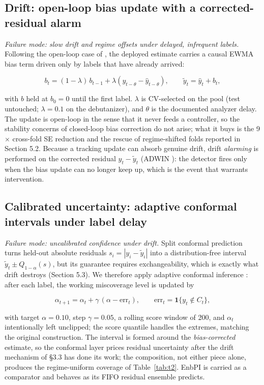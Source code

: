 \subsection{Drift: open-loop bias update with a corrected-residual alarm}

\emph{Failure mode: slow drift and regime offsets under delayed, infrequent labels.}
Following the open-loop case of \citep{shardt2016}, the deployed estimate carries a
causal EWMA bias term driven only by labels that have already arrived:

\[
b_t = (1 - \lambda)\, b_{t-1} + \lambda \left( y_{t-\theta} - \hat{y}_{t-\theta} \right),
\qquad
\tilde{y}_t = \hat{y}_t + b_t,
\]

with \(b\) held at \(b_0 = 0\) until the first label. \(\lambda\) is CV-selected on the pool
(test untouched; \(\lambda = 0.1\) on the debutanizer), and \(\theta\) is the documented
analyzer delay. The update is open-loop in the sense that it never feeds a controller, so the
stability concerns of closed-loop bias correction do not arise; what it buys is the
9$\times$ cross-fold SE reduction and the rescue of regime-shifted folds reported in
Section 5.2. Because a tracking update can absorb genuine drift, drift \emph{alarming} is
performed on the corrected residual \(y_t - \tilde{y}_t\) (ADWIN \citep{bifet2007adwin}): the detector fires only when the bias update can no longer keep up, which is
the event that warrants intervention.

\subsection{Calibrated uncertainty: adaptive conformal intervals under label delay}

\emph{Failure mode: uncalibrated confidence under drift.} Split conformal prediction
\citep{papadopoulos2002} turns held-out absolute residuals
\(s_i = |y_i - \tilde{y}_i|\) into a distribution-free interval
\(\tilde{y}_t \pm Q_{1-\alpha}(s)\), but its guarantee requires exchangeability,
which is exactly what drift destroys (Section 5.3). We therefore apply adaptive conformal
inference \citep{gibbs2021aci}: after each label, the working miscoverage level is
updated by

\[
\alpha_{t+1} = \alpha_t + \gamma\,(\alpha - \mathrm{err}_t),
\qquad
\mathrm{err}_t = \mathbf{1}\{ y_t \notin C_t \},
\]

with target \(\alpha = 0.10\), step \(\gamma = 0.05\), a rolling score window of 200, and
\(\alpha_t\) intentionally left unclipped; the score quantile handles the
extremes, matching the original construction. The interval is formed around the
\emph{bias-corrected} estimate, so the conformal layer prices residual uncertainty after
the drift mechanism of \S 3.3 has done its work; the composition, not either piece
alone, produces the regime-uniform coverage of Table~\ref{tab:t2}. EnbPI \citep{xu2021enbpi} is
carried as a comparator and behaves as its FIFO residual ensemble predicts.

